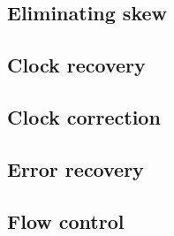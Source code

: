 		\subsection{Eliminating skew}
			
		
		\subsection{Clock recovery}
			
		
		\subsection{Clock correction}
			
		
		\subsection{Error recovery}
			
		
		\subsection{Flow control}
			
